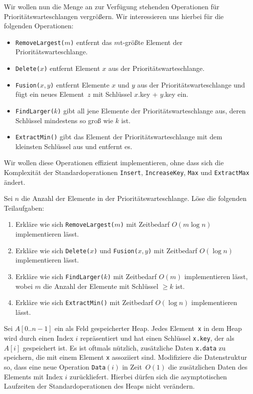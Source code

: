 \documentclass{uebung_cs}
\begin{document}
\begin{aufgabe}
	Wir wollen nun die Menge an zur Verfügung stehenden Operationen für Prioritätswarteschlangen vergrößern.
	Wir interessieren uns hierbei für die folgenden Operationen:
	\begin{itemize}
		\item \texttt{RemoveLargest($m$)} entfernt das $m$t-größte Element der Prioritätswarteschlange.
		\item \texttt{Delete($x$)} entfernt Element $x$ aus der Prioritätswarteschlange.
		\item \texttt{Fusion($x,y$)} entfernt Elemente $x$ und $y$ aus der Prioritätswarteschlange und fügt ein neues Element~$z$ mit Schlüssel $x$.key + $y$.key ein.
		\item \texttt{FindLarger($k$)} gibt all jene Elemente der Prioritätswarteschlange aus, deren Schlüssel mindestens so groß wie $k$ ist.
		\item \texttt{ExtractMin()} gibt das Element der Prioritätswarteschlange mit dem kleinsten Schlüssel aus und entfernt es.
	\end{itemize}
	Wir wollen diese Operationen effizient implementieren, ohne dass sich die Komplexität der Standardoperationen \texttt{Insert}, \texttt{IncreaseKey}, \texttt{Max} und \texttt{ExtractMax} ändert.

	Sei $n$ die Anzahl der Elemente in der Prioritätswarteschlange.
	Löse die folgenden Teilaufgaben:
	\begin{enumerate}
		\item \mittel Erkläre wie sich \texttt{RemoveLargest($m$)} mit Zeitbedarf $O(m\log n)$ implementieren lässt.
		\item \mittel Erkläre wie sich \texttt{Delete($x$)} und \texttt{Fusion($x,y$)} mit Zeitbedarf $O(\log n)$ implementieren lässt.
		\item \note %
    Erkläre wie sich \texttt{FindLarger($k$)} mit Zeitbedarf $O(m)$ implementieren lässt, wobei $m$ die Anzahl der Elemente mit Schlüssel $\geq k$ ist.
		\item \note %
    Erkläre wie sich \texttt{ExtractMin()} mit Zeitbedarf $O(\log n)$ implementieren lässt.
	\end{enumerate}
\end{aufgabe}

\begin{aufgabe}
	Sei $A[0..n-1]$ ein als Feld gespeicherter Heap.
	Jedes Element~\texttt{x} in dem Heap wird durch einen Index $i$ repräsentiert und hat einen Schlüssel \texttt{x.key}, der als $A[i]$ gespeichert ist.
	Es ist oftmals nützlich, zusätzliche Daten \texttt{x.data} zu speichern, die mit einem Element \texttt{x} assoziiert sind.
	Modifiziere die Datenstruktur so, dass eine neue Operation \texttt{Data$(i)$} in Zeit~$O(1)$ die zusätzlichen Daten des Elements mit Index $i$ zurückliefert. Hierbei dürfen sich die asymptotischen Laufzeiten der Standardoperationen des Heaps nicht verändern.
\end{aufgabe}
\end{document}
